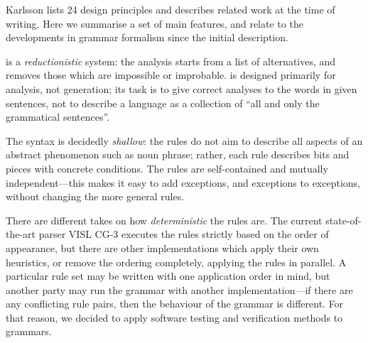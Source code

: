 Karlsson \cite{karlsson1995constraint} lists 24 design principles and describes
related work at the time of writing.
Here we summarise a set of main features, and relate \onlycg{} to the developments in grammar formalism since the initial description.

\onlycg{} is a \emph{reductionistic} system: the analysis starts from a list of alternatives,
and removes those which are impossible or improbable.
\onlycg{} is designed primarily for analysis, not generation; its task is 
to give correct analyses to the words in given sentences,
not to describe a language as a collection of ``all and only the grammatical sentences''.

The syntax is decidedly \emph{shallow}: the rules do not aim to
describe all aspects of an abstract phenomenon such as noun phrase; 
rather, each rule describes bits and pieces with concrete conditions.
The rules are self-contained and mutually independent---this makes it 
easy to add exceptions, and exceptions to exceptions, without 
changing the more general rules.



There are different takes on how \emph{deterministic} the rules are.
The current state-of-the-art \onlycg{} parser VISL CG-3 executes the rules strictly 
based on the order of appearance, but there are other implementations which 
apply their own heuristics, or remove the ordering completely, 
applying the rules in parallel. 
A particular rule set may be written with one application order in mind, but another party may 
run the grammar with another implementation---if there are any conflicting rule pairs, then the behaviour of the grammar is different.
For that reason, we decided to apply software testing and verification methods to \onlycg{} grammars.


